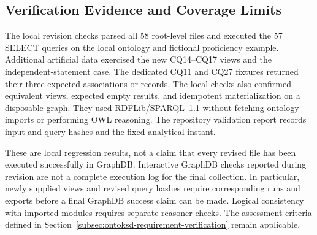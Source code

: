 \subsection{Verification Evidence and Coverage Limits}

The local revision checks parsed all 58 root-level files and executed
the 57 SELECT queries on the local ontology and fictional proficiency
example. Additional artificial data exercised the new CQ14--CQ17 views
and the independent-statement case. The dedicated CQ11 and CQ27
fixtures returned their three expected associations or records. The
local checks also confirmed equivalent views, expected empty results,
and idempotent materialization on a disposable graph. They used
RDFLib/SPARQL~1.1 without fetching ontology imports or performing OWL
reasoning. The repository validation report records input and query
hashes and the fixed analytical instant.

These are local regression results, not a claim that every revised file
has been executed successfully in GraphDB. Interactive GraphDB checks
reported during revision are not a complete execution log for the final
collection. In particular, newly supplied views and revised query hashes
require corresponding runs and exports before a final GraphDB success
claim can be made. Logical consistency with imported modules requires
separate reasoner checks. The assessment criteria defined in
Section~\ref{subsec:ontoksd-requirement-verification} remain applicable.

